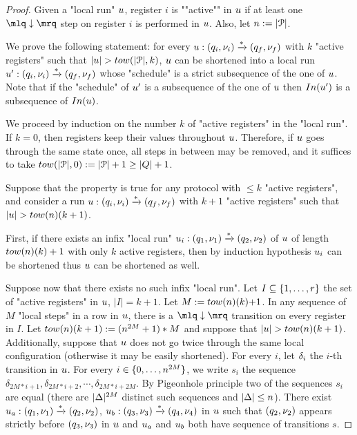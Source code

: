 \ifproofs
\begin{proof}

Given a "local run" $u$, register $i$ is ""active"" in $u$ if at least one $\quotemarks{\enregact}$ step on register $i$ is performed in $u$. Also, let $n:=|\mathcal{P}|$.

We prove the following statement:
for every $u: (q_i, \nu_i) \xrightarrow{*} (q_f, \nu_f)$ with $k$ "active registers" such that $\length{\localrun} > \towerfun(|\prot|,k)$, $u$ can be shortened into a local run $u': (q_i, \nu_i) \xrightarrow{*} (q_f, \nu_f)$ whose "schedule" is a strict subsequence of the one of $u$. Note that if the "schedule" of $u'$ is a subsequence of the one of $u$ then $\Input{\localrun'}$ is a subsequence of $\Input{\localrun}$.

We proceed by induction on the number $k$ of "active registers" in the "local run". If $k=0$, then registers keep their values throughout $u$. Therefore, if $u$ goes through the same state once, all steps in between may be removed, and it suffices to take $\towerfun(\size{\prot}, 0) := |\prot| + 1 \geq |Q| +1$.  

Suppose that the property is true for any protocol with $\leq k$ "active registers", and consider a run $u: (q_i,\nu_i) \xrightarrow{*} (q_f,\nu_f)$ with $k+1$ "active registers" such that $\length{\localrun} > \towerfun(n)(k+1)$.

First, if there exists an infix "local run" $u_i: (q_1, \nu_1) \xrightarrow{*} (q_2, \nu_2)$ of $u$ of length $\towerfun(n)(k)+1$ with only $k$ active registers, then by induction hypothesis $u_i$ can be shortened thus $u$ can be shortened as well.

Suppose now that there exists no such infix "local run".
Let $I \subseteq \{1,\dots,r\}$ the set of "active registers" in $u$, $|I| = k+1$. Let $M:= \towerfun(n)(k){+}1$. 
In any sequence of $M$ "local steps" in a row in $u$, 
there is a $\quotemarks{\enregact}$ transition on every register in $I$. Let $\towerfun(n)(k+1) := (n^{2M}+1)*M$ and suppose that $\length{\localrun} > \towerfun(n)(k+1)$. Additionally, suppose that $u$ does not go twice through the same local configuration (otherwise it may be easily shortened). For every $i$, let $\delta_i$ the $i$-th transition in $u$.
 For every $i \in \{0,\dots,n^{2M}\}$, we write $s_i$ the sequence $\delta_{2M*i+1}, \delta_{2M*i+2}, \cdots, \delta_{2M*i+2M}$.
By Pigeonhole principle two of the sequences $s_i$ are equal (there are $|\Delta|^{2M}$ distinct such sequences and $|\Delta| \leq n$). 
There exist $u_a: (q_1, \nu_1) \xrightarrow{*} (q_2, \nu_2)$, $u_b: (q_3, \nu_3) \xrightarrow{*} (q_4, \nu_4)$ in $u$ such that $(q_2,\nu_2)$ appears strictly before $(q_3,\nu_3)$ in $u$ and $u_a$ and $u_b$ both have sequence of transitions $s$.


\end{proof}
